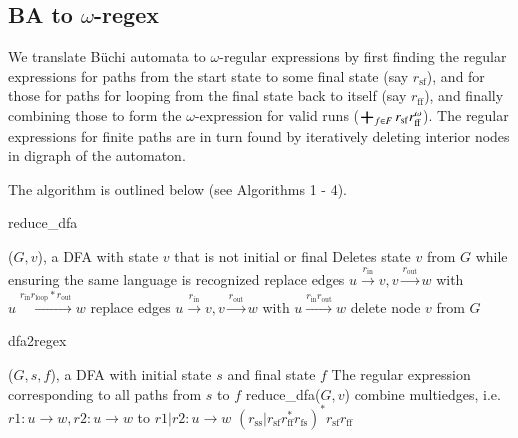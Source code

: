 \documentclass[preprint,12pt]{elsarticle}
\theoremstyle{definition}
\theoremstyle{remark}
\DeclareMathOperator*{\bigplus}{\scalerel*{+}{\sum}}
\newcommand{\Buchi}{B\"{u}chi }
\begin{document}
\subsection{BA to $\omega$-regex} \label{aut2regex}
We translate \Buchi automata to $\omega$-regular expressions by first finding the regular expressions for paths from the start state to some final state (say $r_\mathrm{sf}$), and for those for paths for looping from the final state back to itself (say $r_\mathrm{ff}$), and finally combining those to form the $\omega$-expression for valid runs ($\bigplus_{f\in F} r_\mathrm{sf}r_\mathrm{ff}^\omega$). The regular expressions for finite paths are in turn found by iteratively deleting interior nodes in digraph of the automaton.

The algorithm is outlined below (see Algorithms 1 - 4). %

\begin{algorithm}[h!]
    \caption{reduce\_dfa}
    \begin{algorithmic}
        \Require ($G, v$), a DFA with state $v$ that is not initial or final
        \Ensure Deletes state $v$ from $G$ while ensuring the same language is recognized
                \State replace edges $u\xrightarrow{r_\mathrm{in}} v, v \xrightarrow{r_\mathrm{out}} w$ with $u \xrightarrow{r_\mathrm{in} r_\mathrm{loop}* r_\mathrm{out}} w$
            \Else
                \State replace edges $u\xrightarrow{r_\mathrm{in}} v, v \xrightarrow{r_\mathrm{out}} w$ with $u \xrightarrow{r_\mathrm{in}  r_\mathrm{out}} w$
            \EndIf
        \EndFor
	\State delete node $v$ from $G$
    \end{algorithmic}
\end{algorithm}

\begin{algorithm}[h!]
    \caption{dfa2regex}
    \begin{algorithmic}
        \Require ($G, s, f$), a DFA with initial state $s$ and final state $f$
        \Ensure The regular expression corresponding to all paths from $s$ to $f$
            \State reduce\_dfa($G, v$)
            \State combine multiedges, i.e. $r1 : u \to w, r2 : u \to w$  to $r1 | r2 : u \to w$
        \EndWhile
        \State \Return $(r_\mathrm{ss}| r_\mathrm{sf} r_\mathrm{ff}^* r_\mathrm{fs})^* r_\mathrm{sf} r_\mathrm{ff}$
    \end{algorithmic}
\end{algorithm}
\end{document}
